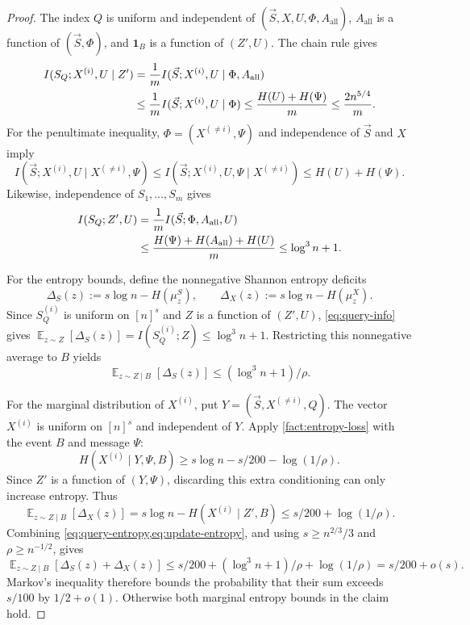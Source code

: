 \documentclass[11pt]{article}
\theoremstyle{plain}
\newtheorem{claim}[theorem]{Claim}
\newcommand{\E}{\mathop{\mathbb{E}}}
\newcommand{\vS}{\vec{S}}
\newcommand{\Aall}{A_{\mathrm{all}}}
\begin{document}
\begin{proof}
The index $Q$ is uniform and independent of $(\vS,X,U,\Phi,\Aall)$,
$\Aall$ is a function of $(\vS,\Phi)$, and $\mathbf1_B$ is a function of
$(Z',U)$. The chain rule gives
\begin{align}
 I(S_Q;X^{(i)},U\mid Z')
 &=\frac1m I(\vS;X^{(i)},U\mid\Phi,\Aall)\notag\\
 &\le\frac1m I(\vS;X^{(i)},U\mid\Phi)
 \le\frac{H(U)+H(\Psi)}m\le\frac{2n^{5/4}}m.\label{eq:before-mi}
\end{align}
For the penultimate inequality, $\Phi=(X^{(\ne i)},\Psi)$ and independence
of $\vS$ and $X$ imply
\[
 I(\vS;X^{(i)},U\mid X^{(\ne i)},\Psi)
 \le I(\vS;X^{(i)},U,\Psi\mid X^{(\ne i)})
 \le H(U)+H(\Psi).
\]
Likewise, independence of $S_1,\ldots,S_m$ gives
\begin{align}
 I(S_Q;Z',U)
 &=\frac1m I(\vS;\Phi,\Aall,U)\notag\\
 &\le\frac{H(\Psi)+H(\Aall)+H(U)}m
 \le\log^3n+1.\label{eq:query-info}
\end{align}

For the entropy bounds, define the nonnegative Shannon entropy deficits
\[
 \Delta_S(z):=s\log n-H(\mu_z^S),\qquad
 \Delta_X(z):=s\log n-H(\mu_z^X).
\]
Since $S_Q^{(i)}$ is uniform on $[n]^s$ and $Z$ is a function of
$(Z',U)$, \eqref{eq:query-info} gives
$\E_{z\sim Z}[\Delta_S(z)]=I(S_Q^{(i)};Z)\le\log^3n+1$.
Restricting this nonnegative average to $B$ yields
\begin{equation}\label{eq:query-entropy}
 \E_{z\sim Z\mid B}[\Delta_S(z)]\le(\log^3n+1)/\rho.
\end{equation}

For the marginal distribution of $X^{(i)}$, put $Y=(\vS,X^{(\ne i)},Q)$.
The vector $X^{(i)}$ is uniform on $[n]^s$ and independent of $Y$.
Apply \cref{fact:entropy-loss} with the event $B$ and message $\Psi$:
\[
 H(X^{(i)}\mid Y,\Psi,B)\ge s\log n-s/200-\log(1/\rho).
\]
Since $Z'$ is a function of $(Y,\Psi)$, discarding this extra
conditioning can only increase entropy. Thus
\begin{equation}\label{eq:update-entropy}
 \E_{z\sim Z\mid B}[\Delta_X(z)]
 =s\log n-H(X^{(i)}\mid Z',B)
 \le s/200+\log(1/\rho).
\end{equation}
Combining \cref{eq:query-entropy,eq:update-entropy}, and using
$s\ge n^{2/3}/3$ and $\rho\ge n^{-1/2}$, gives
\[
 \E_{z\sim Z\mid B}[\Delta_S(z)+\Delta_X(z)]
 \le s/200+(\log^3n+1)/\rho+\log(1/\rho)=s/200+o(s).
\]
Markov's inequality therefore bounds the probability that their sum
exceeds $s/100$ by $1/2+o(1)$. Otherwise both marginal entropy
bounds in the claim hold.


\end{proof}
\end{document}
